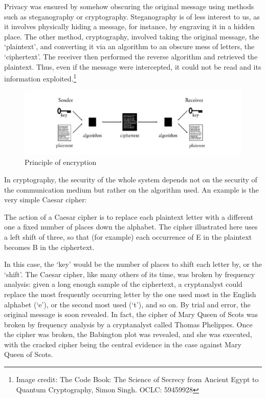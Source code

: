 \documentclass[twoside]{article}
\begin{document}
Privacy was ensured by somehow obscuring the original message using methods such as steganography or
cryptography. Steganography is of less interest to us, as it involves physically hiding a message,
for instance, by engraving it in a hidden place. The other method, cryptography, involved taking the
original message, the `plaintext', and converting it via an algorithm to an obscure mess of letters,
the `ciphertext'. The receiver then performed the reverse algorithm and retrieved the plaintext.
Thus, even if the message were intercepted, it could not be read and its information exploited.\footnote{Image
credit: The Code Book: The Science of Secrecy from Ancient Egypt to Quantum Cryptography, Simon
Singh. OCLC: 59459928}

\begin{figure}[H]
  \centering
  \includegraphics[scale=0.3]{cryp.png}
  \caption{Principle of encryption}
\end{figure}

In cryptography, the security of the whole system depends not on the security of the communication
medium but rather on the algorithm used. An example is the very simple Caesar cipher\cite{caesar}:

\begin{displayquote}
  The action of a Caesar cipher is to replace each plaintext letter with a different one a fixed
number of places down the alphabet. The cipher illustrated here uses a left shift of three, so that
(for example) each occurrence of E in the plaintext becomes B in the ciphertext.
\end{displayquote}


In this case, the `key' would be the number of places to shift each letter by, or the `shift'. The
Caesar cipher, like many others of its time, was broken by frequency analysis: given a long enough
sample of the ciphertext, a cryptanalyst could replace the most frequently occurring letter by the
one used most in the English alphabet (`e'), or the second most used (`t'), and so on. By trial and
error, the original message is soon revealed. In fact, the cipher of Mary Queen of Scots was broken
by frequency analysis by a cryptanalyst called Thomas Phelippes. Once the cipher was broken, the
Babington plot was revealed, and she was executed, with the cracked cipher being the central
evidence in the case against Mary Queen of Scots.
\end{document}
